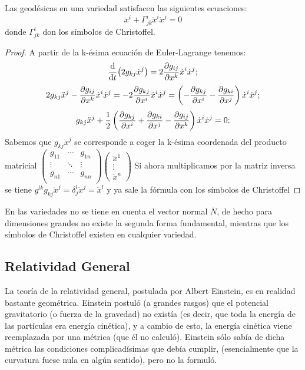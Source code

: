 \documentclass[palatino, bibnumbers]{apuntes}
\begin{document}
\begin{prop}Las geodésicas en una variedad satisfacen las siguientes ecuaciones:
\begin{equation}
\ddot{x}^i+\Gamma^i_{jk}\dot{x}^i\dot{x}^j=0
\end{equation}
donde $\Gamma^i_{jk}$ don los símbolos de Christoffel.
\end{prop}
\begin{proof} A partir de la k-ésima ecuación de Euler-Lagrange tenemos: $$\dv{t}(2g_{kj}\dot{x}^j)=2\pdv{g_{ij}}{x^k}\dot{x}^i\dot{x}^j;$$
	$$2g_{kj}\ddot{x}^j-\pdv{g_{ij}}{x^k}\dot{x}^i\dot{x}^j=-2\pdv{g_{kj}}{x^i}\dot{x}^i\dot{x}^j=\left(-\pdv{g_{kj}}{x^i}-\pdv{g_{ki}}{x^j}\right)\dot{x}^i\dot{x}^j;$$$$g_{kj}\ddot{x}^j+\frac{1}{2}\left(\pdv{g_{kj}}{x^i}+\pdv{g_{ki}}{x^j}-\pdv{g_{ij}}{x^k}\right)\dot{x}^i\dot{x}^j=0;$$
	Sabemos que $g_{kj}\ddot{x}^j$ se corresponde a coger la k-ésima coordenada del producto matricial $\begin{pmatrix}g_{11}&\cdots&g_{1n}\\\vdots&\ddots&\vdots\\g_{n1}&\cdots&g_{nn}\\\end{pmatrix}\begin{pmatrix}\ddot{x}^1\\\vdots\\\ddot{x}^n\end{pmatrix}$ Si ahora multiplicamos por la matriz inversa se tiene $g^{lk}g_{kj}\ddot{x}^j=\delta^l_j\ddot{x}^j=\ddot{x}^l$ y ya sale la fórmula con los símbolos de Christoffel
\end{proof}
En las variedades no se tiene en cuenta el vector normal $\overline{N}$, de hecho para dimensiones grandes no existe la segunda forma fundamental, mientras que los símbolos de Christoffel existen en cualquier variedad.
\subsection{Relatividad General}
La teoría de la relatividad general, postulada por Albert Einstein, es en realidad bastante geométrica. Einstein postuló (a grandes rasgos) que el potencial gravitatorio (o fuerza de la gravedad) no existía (es decir, que toda la energía de las partículas era energía cinética), y a cambio de esto, la energía cinética viene reemplazada por una métrica (que él no calculó). Einstein sólo sabía de dicha métrica las condiciones complicadísimas que debía cumplir, (esencialmente que la curvatura fuese nula en algún sentido), pero no la formuló.
\end{document}
